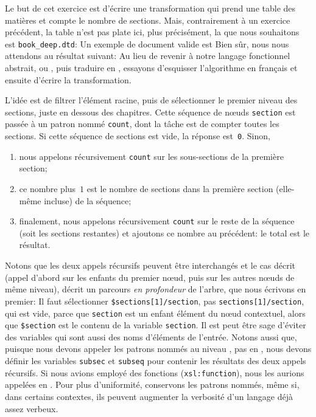 
Le but de cet exercice est d'écrire une transformation \XSLT qui prend
une table des matières et compte le nombre de sections. Mais,
contrairement à un exercice précédent, la table n'est pas plate ici,
plus précisément, la \DTD que nous souhaitons est \texttt{book\_deep.dtd}:
\noindent Un exemple de document \XML valide est
\noindent Bien sûr, nous nous attendons au résultat suivant:
{\small}
Au lieu de revenir à notre langage fonctionnel abstrait, ou \Erlang,
puis traduire en \XSLT, essayons d'esquisser l'algorithme en français
et ensuite d'écrire la transformation.

L'idée est de filtrer l'élément racine, puis de sélectionner le
premier niveau des sections, juste en dessous des chapitres. Cette
séquence de nœuds \texttt{section} est passée à un patron nommé
\texttt{count}, dont la tâche est de compter toutes les sections. Si
cette séquence de sections est vide, la réponse est~\texttt{0}. Sinon,
\begin{enumerate}

\item nous appelons récursivement \texttt{count} sur les sous-sections
  de la première section;

\item ce nombre plus~\(1\) est le nombre de sections dans la première
  section (elle-même incluse) de la séquence;

\item finalement, nous appelons récursivement \texttt{count} sur le
  reste de la séquence (soit les sections restantes) et ajoutons ce
  nombre au précédent: le total est le résultat.

\end{enumerate}
Notons que les deux appels récursifs peuvent être interchangés et le
cas décrit (appel d'abord sur les enfants du premier nœud, puis
sur les autres nœuds de même niveau), décrit un parcours \emph{en
  profondeur} de l'arbre, que nous écrivons en premier:
\noindent Il faut sélectionner \texttt{\$sections[1]/section}, pas
\texttt{sections[1]/section}, qui est vide, parce que \texttt{section}
est un enfant élément du nœud contextuel, alors que
\texttt{\$section} est le contenu de la variable \texttt{section}. Il
est peut être sage d'éviter des variables qui sont aussi des noms
d'éléments de l'entrée. Notons aussi que, puisque nous devons appeler
les patrons nommés au niveau \XSLT, pas en \XPath, nous devons définir
les variables \texttt{subsec} et \texttt{subseq} pour contenir les
résultats des deux appels récursifs. Si nous avions employé des
fonctions \XSLT (\texttt{xsl:function}), nous les aurions appelées en
\XPath. Pour plus d'uniformité, conservons les patrons nommés, même
si, dans certains contextes, ils peuvent augmenter la verbosité d'un
langage déjà assez verbeux.


